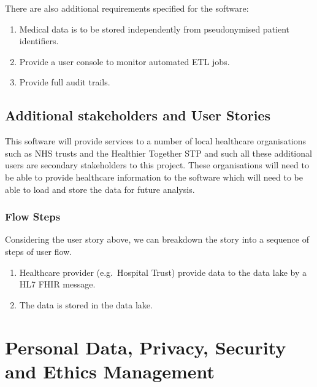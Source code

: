 \documentclass[10pt]{article}
\begin{document}
There are also additional requirements specified for the software:

\begin{enumerate}
\def\labelenumi{\arabic{enumi}.}
\itemsep1pt\parskip0pt
\item
  Medical data is to be stored independently from pseudonymised patient
  identifiers.
\item
  Provide a user console to monitor automated ETL jobs.
\item
  Provide full audit trails.
\end{enumerate}

\subsection{Additional stakeholders and User
Stories}\label{additional-stakeholders-and-user-stories}

This software will provide services to a number of local healthcare
organisations such as NHS trusts and the Healthier Together STP and such
all these additional users are secondary stakeholders to this project.
These organisations will need to be able to provide healthcare
information to the software which will need to be able to load and store
the data for future analysis.

\subsubsection{Flow Steps}\label{flow-steps-1}

Considering the user story above, we can breakdown the story into a
sequence of steps of user flow.

\begin{enumerate}
\def\labelenumi{\arabic{enumi}.}
\itemsep1pt\parskip0pt
\item
  Healthcare provider (e.g.~Hospital Trust) provide data to the data
  lake by a HL7 FHIR message.
\item
  The data is stored in the data lake.
\end{enumerate}

\section{Personal Data, Privacy, Security and Ethics Management}
\end{document}
